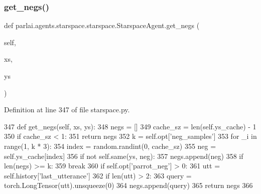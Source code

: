 \subsubsection{\texorpdfstring{get\+\_\+negs()}{get\_negs()}}
{\footnotesize\ttfamily def parlai.\+agents.\+starspace.\+starspace.\+Starspace\+Agent.\+get\+\_\+negs (\begin{DoxyParamCaption}\item[{}]{self,  }\item[{}]{xs,  }\item[{}]{ys }\end{DoxyParamCaption})}



Definition at line 347 of file starspace.\+py.


\begin{DoxyCode}
347     \textcolor{keyword}{def }get\_negs(self, xs, ys):
348         negs = []
349         cache\_sz = len(self.ys\_cache) - 1
350         \textcolor{keywordflow}{if} cache\_sz < 1:
351             \textcolor{keywordflow}{return} negs
352         k = self.opt[\textcolor{stringliteral}{'neg\_samples'}]
353         \textcolor{keywordflow}{for} \_i \textcolor{keywordflow}{in} range(1, k * 3):
354             index = random.randint(0, cache\_sz)
355             neg = self.ys\_cache[index]
356             \textcolor{keywordflow}{if} \textcolor{keywordflow}{not} self.same(ys, neg):
357                 negs.append(neg)
358                 \textcolor{keywordflow}{if} len(negs) >= k:
359                     \textcolor{keywordflow}{break}
360         \textcolor{keywordflow}{if} self.opt[\textcolor{stringliteral}{'parrot\_neg'}] > 0:
361             utt = self.history[\textcolor{stringliteral}{'last\_utterance'}]
362             \textcolor{keywordflow}{if} len(utt) > 2:
363                 query = torch.LongTensor(utt).unsqueeze(0)
364                 negs.append(query)
365         \textcolor{keywordflow}{return} negs
366 
\end{DoxyCode}
\mbox{\label{classparlai_1_1agents_1_1starspace_1_1starspace_1_1StarspaceAgent_a6511fc8a4d2687cd99a981b4e3b6a589}} 

